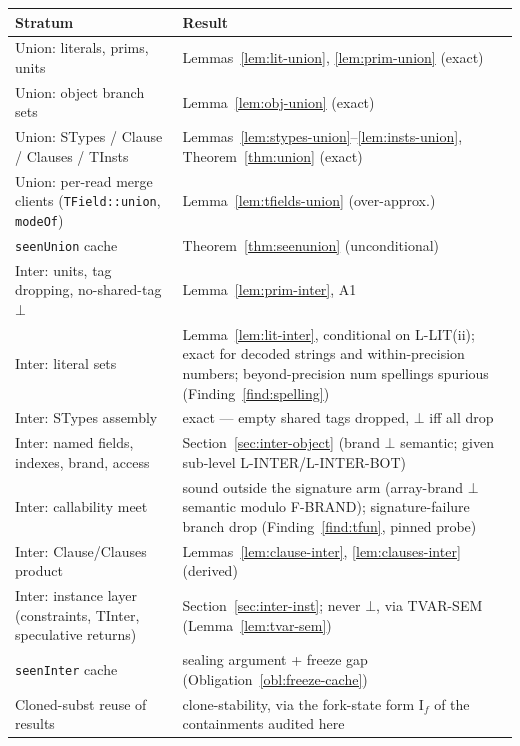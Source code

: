 \documentclass[11pt]{article}
\begin{document}
\begingroup
\renewcommand{\arraystretch}{1.25}
\small
\begin{longtable}{@{}p{4.6cm}p{9.4cm}@{}}
\toprule
\textbf{Stratum} & \textbf{Result} \\
\midrule
\endhead
Union: literals, prims, units & Lemmas~\ref{lem:lit-union},
  \ref{lem:prim-union} (exact) \\
Union: object branch sets & Lemma~\ref{lem:obj-union} (exact) \\
Union: STypes / Clause / Clauses / TInsts &
  Lemmas~\ref{lem:stypes-union}--\ref{lem:insts-union},
  Theorem~\ref{thm:union} (exact) \\
Union: per-read merge clients (\texttt{TField::union},
  \texttt{modeOf}) & Lemma~\ref{lem:tfields-union} (over-approx.) \\
\texttt{seenUnion} cache & Theorem~\ref{thm:seenunion} (unconditional) \\
\midrule
Inter: units, tag dropping, no-shared-tag $\bot$ &
  Lemma~\ref{lem:prim-inter}, A1 \\
Inter: literal sets & Lemma~\ref{lem:lit-inter}, conditional on
  L-LIT(ii); exact for decoded strings and within-precision numbers;
  beyond-precision num spellings spurious
  (Finding~\ref{find:spelling}) \\
Inter: STypes assembly & exact — empty shared tags dropped, $\bot$ iff all
  drop \\
Inter: named fields, indexes, brand, access &
  Section~\ref{sec:inter-object} (brand $\bot$ semantic; given
  sub-level L-INTER/L-INTER-BOT) \\
Inter: callability meet & sound outside the signature arm (array-brand
  $\bot$ semantic modulo F-BRAND); signature-failure branch drop
  (Finding~\ref{find:tfun}, pinned probe) \\
Inter: Clause/Clauses product & Lemmas~\ref{lem:clause-inter},
  \ref{lem:clauses-inter} (derived) \\
Inter: instance layer (constraints, TInter, speculative returns) &
  Section~\ref{sec:inter-inst}; never $\bot$, via TVAR-SEM
  (Lemma~\ref{lem:tvar-sem}) \\
\texttt{seenInter} cache & sealing argument + freeze gap
  (Obligation~\ref{obl:freeze-cache}) \\
Cloned-subst reuse of results & clone-stability, via the fork-state
  form I$_f$ of the containments audited here \\
\bottomrule
\end{longtable}
\endgroup
\end{document}
